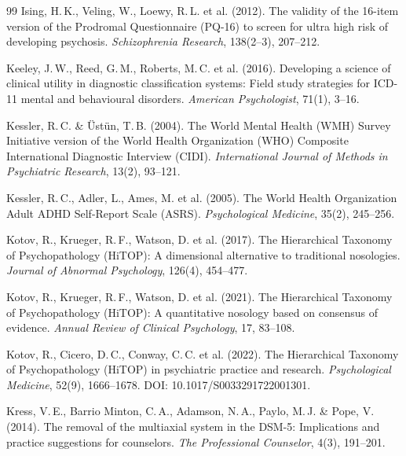\documentclass[11pt,a4paper]{article}
\begin{document}
\begin{thebibliography}{99}
Ising, H.\,K., Veling, W., Loewy, R.\,L. et al. (2012).
\newblock The validity of the 16-item version of the Prodromal Questionnaire (PQ-16) to screen for ultra high risk of developing psychosis.
\newblock \textit{Schizophrenia Research}, 138(2--3), 207--212.

Keeley, J.\,W., Reed, G.\,M., Roberts, M.\,C. et al. (2016).
\newblock Developing a science of clinical utility in diagnostic classification systems: Field study strategies for ICD-11 mental and behavioural disorders.
\newblock \textit{American Psychologist}, 71(1), 3--16.

Kessler, R.\,C. \& \"{U}st\"{u}n, T.\,B. (2004).
\newblock The World Mental Health (WMH) Survey Initiative version of the World Health Organization (WHO) Composite International Diagnostic Interview (CIDI).
\newblock \textit{International Journal of Methods in Psychiatric Research}, 13(2), 93--121.

Kessler, R.\,C., Adler, L., Ames, M. et al. (2005).
\newblock The World Health Organization Adult ADHD Self-Report Scale (ASRS).
\newblock \textit{Psychological Medicine}, 35(2), 245--256.

Kotov, R., Krueger, R.\,F., Watson, D. et al. (2017).
\newblock The Hierarchical Taxonomy of Psychopathology (HiTOP): A dimensional alternative to traditional nosologies.
\newblock \textit{Journal of Abnormal Psychology}, 126(4), 454--477.

Kotov, R., Krueger, R.\,F., Watson, D. et al. (2021).
\newblock The Hierarchical Taxonomy of Psychopathology (HiTOP): A quantitative nosology based on consensus of evidence.
\newblock \textit{Annual Review of Clinical Psychology}, 17, 83--108.

Kotov, R., Cicero, D.\,C., Conway, C.\,C. et al. (2022).
\newblock The Hierarchical Taxonomy of Psychopathology (HiTOP) in psychiatric practice and research.
\newblock \textit{Psychological Medicine}, 52(9), 1666--1678. DOI: 10.1017/S0033291722001301.

Kress, V.\,E., Barrio Minton, C.\,A., Adamson, N.\,A., Paylo, M.\,J. \& Pope, V. (2014).
\newblock The removal of the multiaxial system in the DSM-5: Implications and practice suggestions for counselors.
\newblock \textit{The Professional Counselor}, 4(3), 191--201.


\end{thebibliography}
\end{document}
